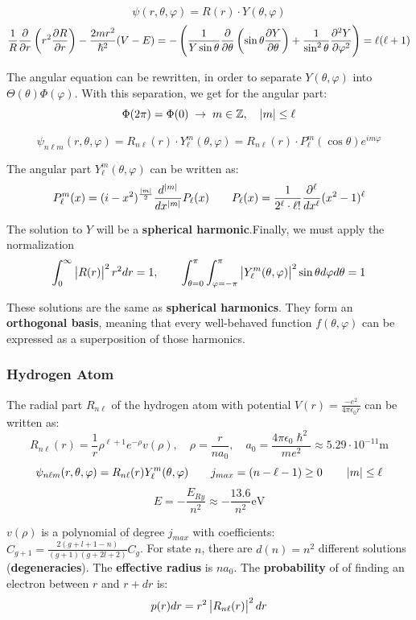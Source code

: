\documentclass[a4paper, 9pt]{extarticle}
\begin{document}
$$\psi(r,\theta, \varphi) = R(r) \cdot Y(\theta, \varphi)$$
{\small $$\frac1R \frac{\partial }{\partial r} \left(r^2 \frac{\partial R}{\partial r}\right) - \frac{2mr^2}{\hslash^2} (V-E) = - \left( \frac{1}{Y \sin \theta} \frac{\partial }{\partial \theta} \left( \sin \theta \frac{\partial Y}{\partial \theta} \right) + \frac{1}{\sin^2 \theta} \frac{\partial^2 Y}{\partial \varphi ^2} \right) =\ell(\ell+1)$$}

The angular equation can be rewritten, in order to separate $Y(\theta, \varphi)$ into $\Theta(\theta)\Phi(\varphi)$. With this separation, we get for the angular part:
$$\Phi(2\pi) = \Phi(0) \; \rightarrow \; m \in \mathbb{Z}, \quad \left| m \right| \leq \ell$$

$$\psi_{n \ell m}(r,\theta,\varphi) = R_{n \ell}(r) \cdot Y_\ell^m (\theta, \varphi) = R_{n\ell}(r) \cdot P_\ell^m(\cos \theta) e^{i m \varphi}$$

The angular part $Y_\ell^m(\theta, \varphi)$ can be written as:
$$P_\ell^m(x) = (i-x^2)^{\frac{\left| m \right|}{2}} \frac{d^{\left| m \right|}}{dx^{\left| m \right|}} P_\ell(x) \qquad P_\ell(x) = \frac{1}{2^\ell \cdot \ell!} \frac{\partial^\ell}{dx^\ell} (x^2-1)^\ell$$

The solution to $Y$ will be a \textbf{spherical harmonic}.Finally, we must apply the normalization
$$\int_0^\infty \left| R(r) \right|^2 r^2 dr = 1, \qquad \int_{\theta=0}^{\pi} \int_{\varphi=-\pi}^{\pi} \left| Y_\ell^m(\theta,\varphi) \right|^2 \sin \theta d\varphi d\theta = 1$$

These solutions are the same as \textbf{spherical harmonics}. 
They form an \textbf{orthogonal basis}, meaning that every well-behaved function $f(\theta, \varphi)$ can be expressed as a superposition of those harmonics.

\subsubsection{Hydrogen Atom}

The radial part $R_{n\ell}$ of the hydrogen atom with potential $V(r) = \frac{-e^2}{4\pi\epsilon_0 r}$ can be written as:
$$R_{n\ell}(r) = \frac{1}{r} \rho^{\ell+1} e^{-\rho} v(\rho), \quad \rho = \frac{r}{n a_0}, \quad a_0 = \frac{4\pi \epsilon_0 \hslash^2}{m e^2} \approx  5.29 \cdot 10^{-11} \si{\meter}$$
$$\psi_{n\ell m}(r,\theta,\varphi) = R_{n\ell}(r) Y_\ell^m(\theta,\varphi) \qquad  j_{max} = (n-\ell-1) \geq 0 \qquad \left| m \right| \leq \ell$$
$$E = -\frac{E_{Ry}}{n^2} \approx -\frac{13.6}{n^2} \si{\electronvolt}$$

$v(\rho)$ is a polynomial of degree $j_{max}$ with coefficients: $C_{g+1} = \frac{2(g+l+1-n)}{(g+1)(g+2l+2)} C_g$. 
For state $n$, there are $d(n) = n^2$ different solutions (\textbf{degeneracies}). 
The \textbf{effective radius} is $n a_0$.
The \textbf{probability} of of finding an electron between $r$ and $r+dr$ is:
$$p(r) dr = r^2 \left| R_{n\ell}(r) \right|^2 dr$$
\end{document}
